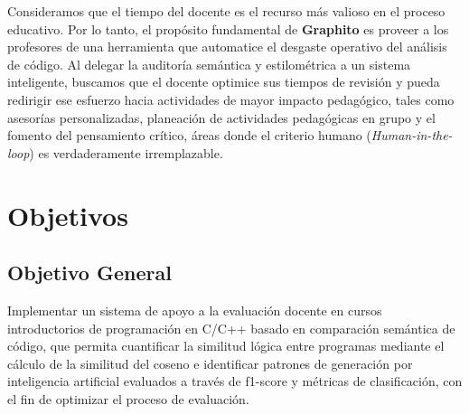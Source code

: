 Consideramos que el tiempo del docente es el recurso más valioso en el proceso educativo. Por lo tanto, el propósito fundamental de \textbf{Graphito} es proveer a los profesores de una herramienta que automatice el desgaste operativo del análisis de código. Al delegar la auditoría semántica y estilométrica a un sistema inteligente, buscamos que el docente optimice sus tiempos de revisión y pueda redirigir ese esfuerzo hacia actividades de mayor impacto pedagógico, tales como asesorías personalizadas, planeación de actividades pedagógicas en grupo y el fomento del pensamiento crítico, áreas donde el criterio humano (\textit{Human-in-the-loop}) es verdaderamente irremplazable.

\section{Objetivos}
\subsection{Objetivo General}
Implementar un sistema de apoyo a la evaluación docente en cursos introductorios de programación en C/C++ basado en comparación semántica de código, que permita cuantificar la similitud lógica entre programas mediante el cálculo de la similitud del coseno e identificar patrones de generación por inteligencia artificial evaluados a través de f1-score y métricas de clasificación, con el fin de optimizar el proceso de evaluación.

